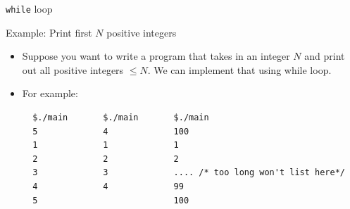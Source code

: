 \documentclass[10pt,xcolor={table,dvipsnames},t]{beamer}
\begin{document}
\begin{frame}[fragile]{\texttt{while} loop}
  \begin{exampleblock}{Example: Print first $N$ positive integers}
    \begin{itemize}
      \item Suppose you want to write a program that takes in an integer $N$ and print out all positive integers $\leq N$. We can implement that using while loop.
      \item For example:
\begin{lstlisting}
  $./main       $./main       $./main 
  5             4             100
  1             1             1
  2             2             2
  3             3             .... /* too long won't list here*/
  4             4             99
  5                           100
\end{lstlisting}
    \end{itemize}
  \end{exampleblock}
\end{frame}
\end{document}
